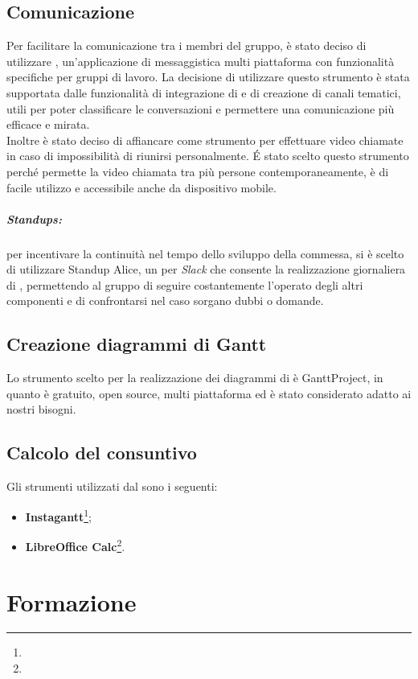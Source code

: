 \documentclass[NormeDiProgetto.tex]{subfiles}
\begin{document}
	\subsection{Comunicazione}
	Per facilitare la comunicazione tra i membri del gruppo, è stato deciso di utilizzare , un'applicazione di messaggistica multi piattaforma con funzionalità specifiche per gruppi di lavoro. La decisione di utilizzare questo strumento è stata supportata dalle funzionalità di integrazione di  e di creazione di canali tematici, utili per poter classificare le conversazioni e permettere una comunicazione più efficace e mirata.\\
	Inoltre è stato deciso di affiancare  come strumento per effettuare video chiamate in caso di impossibilità di riunirsi personalmente. \'{E} stato scelto questo strumento perché permette la video chiamata tra più persone contemporaneamente, è di facile utilizzo e accessibile anche da dispositivo mobile.\\

	\subparagraph{Standups:} per incentivare la continuità nel tempo dello sviluppo della commessa, si è scelto di utilizzare Standup Alice, un  per \emph{Slack} che consente la realizzazione giornaliera di , permettendo al gruppo di seguire costantemente l'operato degli altri componenti e di confrontarsi nel caso sorgano dubbi o domande.

	\subsection{Creazione diagrammi di Gantt}
	Lo strumento scelto per	la realizzazione dei diagrammi di  è GanttProject, in quanto è gratuito, open source, multi piattaforma ed è stato considerato adatto ai nostri bisogni.
	\subsection{Calcolo del consuntivo}
	Gli strumenti utilizzati dal \respdiprog{} sono i seguenti:
	\begin{itemize}
		\item \textbf{Instagantt}\footnote{};
		\item \textbf{LibreOffice Calc}\footnote{}.
	\end{itemize}
	
	\section{Formazione}
\end{document}
